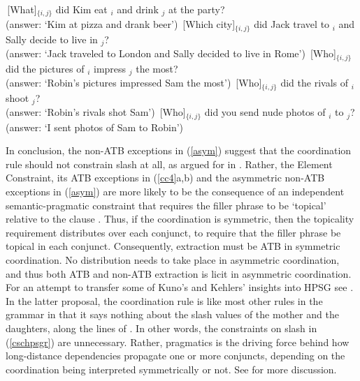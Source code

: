 \documentclass[output=paper
	        ,collection
	        ,collectionchapter
 	        ,biblatex
                ,babelshorthands
                ,newtxmath
                ,draftmode
                ,colorlinks, citecolor=brown
]{langscibook}
\begin{document}
\eal \label{cumulative}
\ex
\,[What]$_{\lbrace i,j \rbrace}$ did Kim eat \spc$_i$ and drink \spc$_j$ at the party?\\
(answer: `Kim at pizza and drank beer')
\ex \,[Which city]$_{\lbrace i,j \rbrace}$ did Jack travel to \spc$_i$ and Sally decide to live in \spc$_j$?\\
(answer: `Jack traveled to London and Sally decided to live in Rome')
\ex \,[Who]$_{\lbrace i,j \rbrace}$ did the pictures of \spc$_i$ impress \spc$_j$ the most?\\
(answer: `Robin's pictures impressed Sam the most')
\ex \,[Who]$_{\lbrace i,j \rbrace}$ did the rivals of \spc$_i$ shoot \spc$_j$?\\
(answer: `Robin's rivals shot Sam')
\ex \,[Who]$_{\lbrace i,j \rbrace}$ did you send nude photos of \spc$_i$ to \spc$_j$?\\
(answer: `I sent photos of Sam to Robin')
\zl


In conclusion, the  non-ATB exceptions in (\ref{asym}) suggest that the coordination rule should not constrain {\sc slash} at all, as argued for in \citet{chaves}.  Rather,  the Element Constraint, its ATB exceptions in (\ref{cc4}a,b) and the asymmetric non-ATB exceptions in (\ref{asym}) are more likely to be the consequence of an independent semantic-pragmatic constraint that requires the filler phrase to be `topical'  relative to the clause \citep{lakoff86,kuno87,kehler,kubotalee}. Thus, if the coordination is  symmetric, then the topicality requirement  distributes over each conjunct, to require that the  filler phrase be topical in each conjunct. Consequently, extraction must
be ATB in symmetric coordination. No distribution needs to take place in asymmetric coordination, and thus both 
ATB and non-ATB extraction is licit in asymmetric coordination. For an attempt to transfer
some of Kuno's and Kehlers' insights into HPSG  see \citet{chaves}. In the latter proposal,
 the coordination rule is like most other rules in the grammar in that it says nothing about
the {\sc slash} values of the mother and the daughters, along the lines of 
\citet[354]{levhubook}. In other words, the constraints on {\sc slash} in (\ref{cschpsgr}) are unnecessary.  Rather, pragmatics is the driving force behind how  long-distance dependencies propagate one or more conjuncts, depending on the coordination being interpreted symmetrically or not. 
See  for more discussion.
\end{document}
